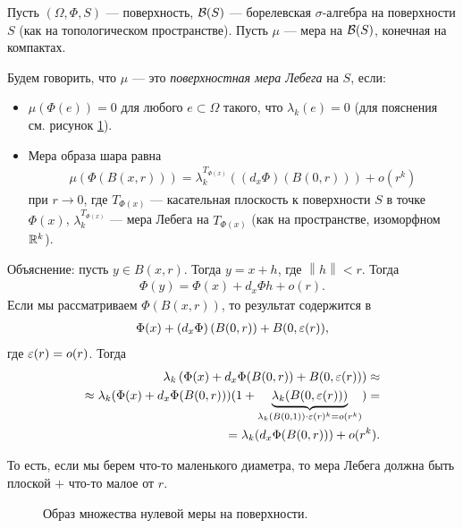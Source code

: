 \begin{df}
 \label{definition:lebesgue_measure_on_surface}
 Пусть $(\Omega, \Phi, S)$ --- поверхность, $\mathcal{B}(S)$ --- борелевская $\sigma$-алгебра на поверхности $S$ (как на топологическом пространстве). Пусть $\mu$ --- мера на $\mathcal{B}(S)$, конечная на компактах.

 Будем говорить, что $\mu$ --- это \textit{поверхностная мера Лебега} на $S$, если:
 \begin{itemize}
  \item $\mu(\Phi(e)) = 0$ для любого $e \subset \Omega$ такого, что $\lambda_k(e) = 0$ (для пояснения см. рисунок \ref{fig:small_set_on_surface}).
  \item Мера образа шара равна 
\begin{align}
 \label{equation:surface_lebesgue_measure_ball}
\mu(\Phi(B(x,r))) = \lambda_k^{T_{\Phi(x)}}((d_x \Phi)(B(0, r))) + o(r^{k})
\end{align}
при $r \to 0$, где $T_{\Phi(x)}$ --- касательная плоскость к поверхности $S$ в точке $\Phi(x)$, $\lambda_k^{T_{\Phi(x)}}$ --- мера Лебега на $T_{\Phi(x)}$ (как на пространстве, изоморфном $\mathbb{R}^{k}$).
 \end{itemize}
\end{df}

Объяснение: пусть $y \in B(x, r)$. Тогда $y = x + h$, где $\left\| h \right\| < r$. Тогда 
\begin{align*}
 \Phi(y) = \Phi(x) + d_{x} \Phi h + o(r)
.\end{align*}
Если мы рассматриваем $\Phi(B(x, r))$, то результат содержится в 
\begin{align*}
\Phi(x) + \left( d_x \Phi \right) (B(0, r)) + B(0, \varepsilon(r)),
\end{align*}
 где $\varepsilon(r) = o(r)$. Тогда
 \begin{align*}
  \lambda_k\left( \Phi(x) + d_x \Phi (B(0, r)) + B(0, \varepsilon(r)) \right) \approx \\
  \approx \lambda_k(\Phi(x) + d_x \Phi(B(0, r)))(1 +  \underbrace{\lambda_k(B(0, \varepsilon(r)))}_{\lambda_k(B(0,1))\cdot \varepsilon(r)^{k} = o(r^{k})} ) = \\
  = \lambda_k(d_x \Phi (B(0, r))) + o(r^{k})
 .\end{align*} 

То есть, если мы берем что-то маленького диаметра, то мера Лебега должна быть плоской $+$ что-то малое от $r$.

\begin{figure}[ht]
    \centering
    \caption{Образ множества нулевой меры на поверхности.}
    \label{fig:small_set_on_surface}
\end{figure}

